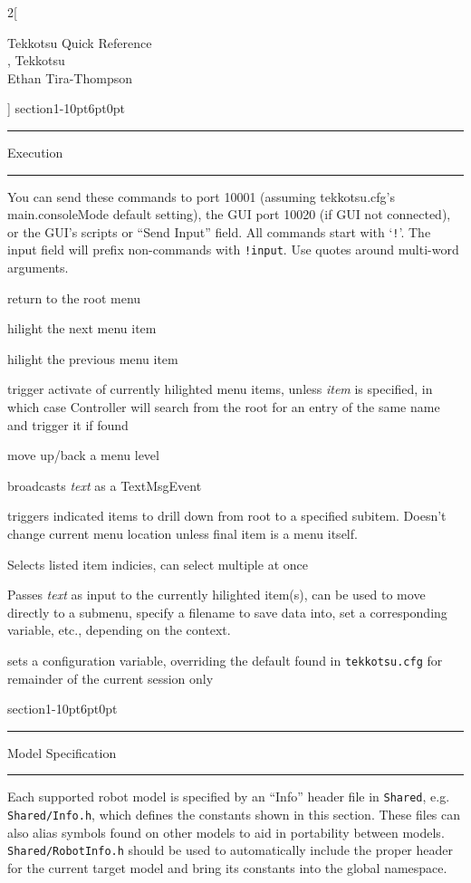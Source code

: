 \documentclass[10pt]{article}
\makeatletter
\renewcommand{\labelitemi}{{\tiny $\blacklozenge$}}
\newlength{\QRsubindent}
\newenvironment{keylist}
	{\begin{list}{}{
		\flushleft
		\providecommand{\keyliststyle}{\tt}
		\renewcommand{\makelabel}[1]{\labelitemi\ {\keyliststyle ##1} - }
		\setlength{\QRsubindent}{6pt}
		\setlength{\itemsep}{2pt}
		\setlength{\parsep}{0pt}
		\setlength{\labelsep}{0pt}
		\setlength{\leftmargin}{12pt}
		\setlength{\labelwidth}{9pt}
		\setlength{\parindent}{0pt}
		\setlength{\listparindent}{0pt}}}
	{\end{list}}
\renewcommand{\section}[1]{\@startsection%
	{section}{1}{-10pt}{6pt}{0pt}{\Large\bf\hspace{6pt}\rule[.2\lineheight]{24pt}{2pt}\hspace{-30pt}}%
	{\hspace{28pt}#1}%
}
\renewcommand{\subsection}[1]{\@startsection{subsection}{2}{0pt}{3pt}{0.01pt}{\large\bf}{#1}}
\newenvironment{QRsection}[1]
	{\section{#1}\hspace{6pt}\rule[.2\lineheight]{72pt}{2pt}}
	{}
\newenvironment{QRsubsection}[1]
	{\subsection{#1}}
	{}
\renewcommand{\maketitle}{\begin{center}%
\large{\huge Tekkotsu Quick Reference} \vspace{6pt} \\%
\model, Tekkotsu \release \vspace{6pt} \\%
Ethan Tira-Thompson \vspace{12pt}%
\end{center}
}
\makeatother
\begin{document}
\begin{multicols}{2}[\maketitle]
\begin{QRsection}{Execution}
\begin{QRsubsection}{Controller}
You can send these commands to port 10001 (assuming tekkotsu.cfg's main.consoleMode default setting), the GUI port 10020 (if GUI not connected), or the GUI's scripts or ``Send Input'' field.  All commands start with `{\tt !}'.  The input field will prefix non-commands with {\tt !input}.  Use quotes around multi-word arguments.

\begin{keylist}
\item[!reset] return to the root menu
\item[!next] hilight the next menu item
\item[!prev] hilight the previous menu item
\item[!select {\rm[{\em item}]}] trigger activate of currently hilighted menu items, unless {\em item} is specified, in which case Controller will search from the root for an entry of the same name and trigger it if found
\item[!cancel] move up/back a menu level
\item[!msg {\rm\em text}] broadcasts {\em text} as a TextMsgEvent
\item[!root {\rm {\em item} [{\em subitem} ...]}] triggers indicated items to drill down from root to a specified subitem.  Doesn't change current menu location unless final item is a menu itself.
\item[!hilight {\rm [{\em n1} [{\em n2} ...]]}] Selects listed item indicies, can select multiple at once
\item[!input {\rm\em text}] Passes {\em text} as input to the currently hilighted item(s), can be used to move directly to a submenu, specify a filename to save data into, set a corresponding variable, etc., depending on the context.
\item[!set {\rm\em section.key}={\rm\em value}] sets a configuration variable, overriding the default found in {\tt tekkotsu.cfg} for remainder of the current session only
\end{keylist}
\end{QRsubsection}
\end{QRsection}





\begin{QRsection}{Model Specification}
Each supported robot model is specified by an ``Info'' header file in {\tt Shared}, e.g. {\tt Shared/\condensedmodel Info.h}, which defines the constants shown in this section.  These files can also alias symbols found on other models to aid in portability between models.  {\tt Shared/RobotInfo.h} should be used to automatically include the proper header for the current target model and bring its constants into the global namespace.


\end{QRsection}
\end{multicols}
\end{document}
